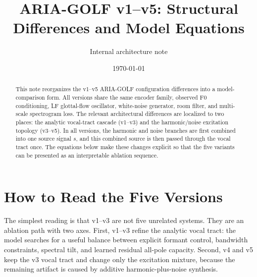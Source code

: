 \documentclass[11pt]{article}
\title{ARIA-GOLF v1--v5: Structural Differences and Model Equations}
\author{Internal architecture note}
\date{\today}
\newcommand{\src}{s}
\begin{document}
\maketitle

\begin{abstract}
This note reorganizes the v1--v5 ARIA-GOLF configuration differences into a
model-comparison form. All versions share the same encoder family, observed
F0 conditioning, LF glottal-flow oscillator, white-noise generator, room
filter, and multi-scale spectrogram loss. The relevant architectural
differences are localized to two places: the analytic vocal-tract cascade
(v1--v3) and the harmonic/noise excitation topology (v3--v5). In all versions,
the harmonic and noise branches are first combined into one source signal
$\src$, and this combined source is then passed through the vocal tract once.
The equations below make these changes explicit so that the five variants can
be presented as an interpretable ablation sequence.
\end{abstract}

\section*{How to Read the Five Versions}

The simplest reading is that v1--v3 are not five unrelated systems. They are
an ablation path with two axes. First, v1--v3 refine the analytic vocal tract:
the model searches for a useful balance between explicit formant control,
bandwidth constraints, spectral tilt, and learned residual all-pole capacity.
Second, v4 and v5 keep the v3 vocal tract and change only the excitation
mixture, because the remaining artifact is caused by additive harmonic-plus-noise
synthesis.
\end{document}
